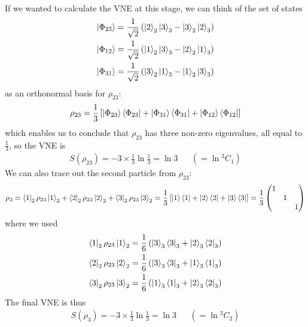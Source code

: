 \documentclass[12pt,twoside]{article}
\numberwithin{equation}{section}
\begin{document}
{\begin{equation}
\begin{aligned}
\end{aligned}\end{equation}
If we wanted to calculate the VNE at this stage, we can think of the set of states
\begin{equation}\begin{aligned}
	\ket{\Phi_{23}} &= \frac{1}{\sqrt 2}\left(\ket{2}_2\ket{3}_3 - \ket{3}_2\ket{2}_3\right)\\
	\ket{\Phi_{12}} &= \frac{1}{\sqrt 2}\left(\ket{1}_2\ket{3}_3 - \ket{2}_2\ket{1}_3\right)\\
	\ket{\Phi_{31}} &= \frac{1}{\sqrt 2}\left(\ket{3}_2\ket{1}_3 - \ket{1}_2\ket{3}_3\right)
\end{aligned}\end{equation}
as an orthonormal basis for \(\rho_{23}\):
\begin{equation}\begin{aligned}
	\rho_{23} = \frac{1}{3}\left[\ket{\Phi_{23}}\bra{\Phi_{23}} + \ket{\Phi_{31}}\bra{\Phi_{31}} + \ket{\Phi_{12}}\bra{\Phi_{12}}\right]
\end{aligned}\end{equation}
which enables us to conclude that \(\rho_{23}\) has three non-zero eigenvalues, all equal to \(\frac{1}{3}\), so the VNE is
\begin{equation}\begin{aligned}
	S(\rho_{23}) = -3 \times \frac{1}{3}\ln \frac{1}{3} = \ln 3 &&(= \ln {}^3 C_1)
\end{aligned}\end{equation}
We can also trace out the second particle from \(\rho_{23}\):
\begin{equation}\begin{aligned}
	\rho_3 = \bra{1}_2\rho_{23}\ket{1}_2 + \bra{2}_2\rho_{23}\ket{2}_2 + \bra{3}_2\rho_{23}\ket{3}_2 = \frac{1}{3}\left[\ket{1}\bra{1} + \ket{2}\bra{2} + \ket{3}\bra{3}\right] = \frac{1}{3}\begin{pmatrix} 1 & & \\ & 1 & \\ & & 1 \end{pmatrix} 
\end{aligned}\end{equation}
where we used
\begin{equation}\begin{aligned}
	\bra{1}_2\rho_{23}\ket{1}_2 = \frac{1}{6}\left(\ket{3}_3\bra{3}_3+\ket{2}_3\bra{2}_3\right)\\
	\bra{2}_2\rho_{23}\ket{2}_2 = \frac{1}{6}\left(\ket{3}_3\bra{3}_3+\ket{1}_3\bra{1}_3\right)\\
	\bra{3}_2\rho_{23}\ket{3}_2 = \frac{1}{6}\left(\ket{1}_3\bra{1}_3+\ket{2}_3\bra{2}_3\right)\\
\end{aligned}\end{equation}
The final VNE is thus
\begin{equation}\begin{aligned}
S(\rho_{3}) = -3 \times \frac{1}{3}\ln \frac{1}{3} = \ln 3 && (=\ln {}^3 C_2)
\end{aligned}\end{equation}

}
\end{document}
